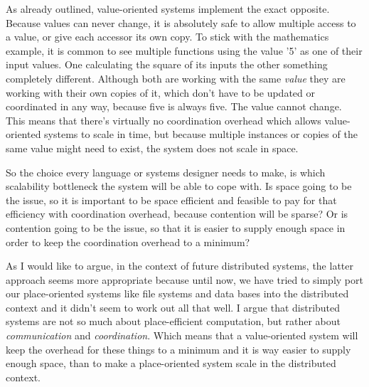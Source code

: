 As already outlined, value-oriented systems implement the exact
opposite. Because values can never change, it is absolutely
safe to allow multiple access to a value, or give each accessor
its own copy. To stick with the mathematics example, it is common
to see multiple functions using the value '5' as one of their
input values. One calculating the square of its inputs the other
something completely different. Although both are working with
the same \textit{value} they are working with their own copies of it,
which don't have to be updated or coordinated in any way, because
five is always five. The value cannot change. This means that there's
virtually no coordination overhead which allows value-oriented
systems to scale in time, but because multiple instances or copies
of the same value might need to exist, the system does not scale in
space.
\newline

So the choice every language or systems designer needs to make,
is which scalability bottleneck the system will be able to cope with.
Is space going to be the issue, so it is important to be space efficient
and feasible to pay for that efficiency with coordination overhead,
because contention will be sparse? Or is contention going to be the
issue, so that it is easier to supply enough space in order to keep
the coordination overhead to a minimum?

As I would like to argue, in the context of future
distributed systems,
the latter approach seems more appropriate because until now, we
have tried to simply port our place-oriented systems like file
systems and data bases into the distributed context and it didn't
seem to work out all that well. I argue that distributed systems
are not so much about place-efficient computation, but rather about
\textit{communication} and \textit{coordination}. Which means that
a value-oriented system will keep the overhead for these things to
a minimum and it is way easier to supply enough space, than to make
a place-oriented system scale in the distributed context.


